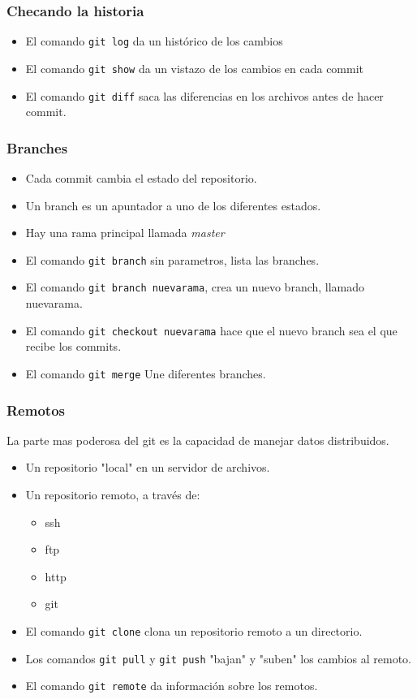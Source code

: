 \begin{frame}
	\frametitle{Checando la historia}
	\begin{itemize}
		\item El comando \texttt{git log} da un hist\'orico de los cambios
		\item El comando \texttt{git show} da un vistazo de los cambios en cada commit
		\item El comando \texttt{git diff} saca las diferencias en los archivos antes de hacer commit. 
	\end{itemize}
\end{frame}

\begin{frame}
	\frametitle{Branches}
	\begin{itemize}
		\item Cada commit cambia el estado del repositorio.
		\item Un branch es un apuntador a uno de los diferentes estados. 
		\item Hay una rama principal llamada \emph{master}
		\item El comando \texttt{git branch} sin parametros, lista las branches.
		\item El comando \texttt{git branch nuevarama}, crea un nuevo branch, llamado nuevarama.
		\item El comando \texttt{git checkout nuevarama} hace que el nuevo branch sea el que recibe los commits. 
		\item El comando \texttt{git merge} Une diferentes branches. 
	\end{itemize}
\end{frame}
\begin{frame}
	\frametitle{Remotos}
	La parte mas poderosa del git es la capacidad de manejar datos distribuidos. \
	\begin{itemize}
		\item Un repositorio "local" en un servidor de archivos. 
		\item Un repositorio remoto, a trav\'es de:
			\begin{itemize}
				\item ssh
				\item ftp
				\item http
				\item git
			\end{itemize}
		\item El comando \texttt{git clone} clona un repositorio remoto a un directorio.
		\item Los comandos \texttt{git pull} y \texttt{git push} "bajan" y "suben" los cambios al remoto.
		\item El comando \texttt{git remote} da informaci\'on sobre los remotos. 
	\end{itemize}
\end{frame}
